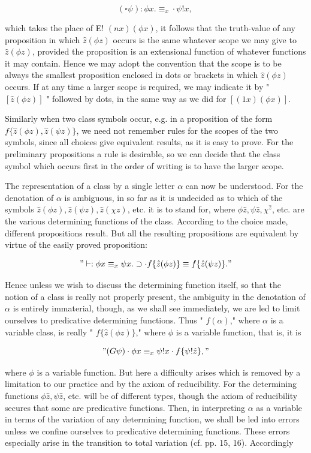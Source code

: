 \documentclass[10pt]{article}
\begin{document}
$$
(\square \psi): \phi x . \equiv_{x} \cdot \psi!x \text {, }
$$

which takes the place of E! $(n x)(\phi x)$, it follows that the truth-value of any proposition in which $\hat{z}(\phi z)$ occurs is the same whatever scope we may give to $\hat{z}(\phi z)$, provided the proposition is an extensional function of whatever functions it may contain. Hence we may adopt the convention that the scope is to be always the smallest proposition enclosed in dots or brackets in which $\hat{z}(\phi z)$ occurs. If at any time a larger scope is required, we may indicate it by " $[\hat{z}(\phi z)]$ " followed by dots, in the same way as we did for $[(1 x)(\phi x)]$.

Similarly when two class symbols occur, e.g. in a proposition of the form $f\{\hat{z}(\phi z), \hat{z}(\psi z)\}$, we need not remember rules for the scopes of the two symbols, since all choices give equivalent results, as it is easy to prove. For the preliminary propositions a rule is desirable, so we can decide that the class symbol which occurs first in the order of writing is to have the larger scope.

The representation of a class by a single letter $\alpha$ can now be understood. For the denotation of $\alpha$ is ambiguous, in so far as it is undecided as to which of the symbols $\hat{z}(\phi z), \hat{z}(\psi z), \hat{z}(\chi z)$, etc. it is to stand for, where $\phi \hat{z}, \psi \hat{z}, \chi^{\hat{z}}$, etc. are the various determining functions of the class. According to the choice made, different propositions result. But all the resulting propositions are equivalent by virtue of the easily proved proposition:

$$
" \vdash: \phi x \equiv_{x} \psi x . \supset \cdot f\{\hat{z}(\phi z)\} \equiv f\{\hat{z}(\psi z)\} . "
$$

Hence unless we wish to discuss the determining function itself, so that the notion of a class is really not properly present, the ambiguity in the denotation of $\alpha$ is entirely immaterial, though, as we shall see immediately, we are led to limit ourselves to predicative determining functions. Thus " $f(\alpha)$," where $\alpha$ is a variable class, is really " $f\{\hat{z}(\phi z)\}$," where $\phi$ is a variable function, that is, it is

$$
"(G \psi) \cdot \phi x \equiv_{x} \psi!x \cdot f\{\psi!\hat{z}\}, "
$$

where $\phi$ is a variable function. But here a difficulty arises which is removed by a limitation to our practice and by the axiom of reducibility. For the determining functions $\phi \hat{z}, \psi \hat{z}$, etc. will be of different types, though the axiom of reducibility secures that some are predicative functions. Then, in interpreting $\alpha$ as a variable in terms of the variation of any determining function, we shall be led into errors unless we confine ourselves to predicative determining functions. These errors especially arise in the transition to total variation (cf. pp. 15, 16). Accordingly
\end{document}
